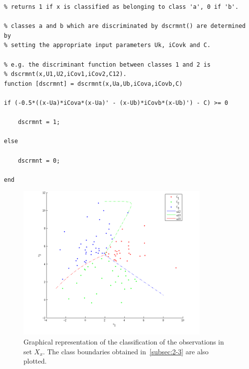 \documentclass[paper=a4, fontsize=11pt]{scrartcl} %
\numberwithin{equation}{section} %
\numberwithin{figure}{section} %
\numberwithin{table}{section} %
\begin{document}
\begin{lstlisting}[label=lst:2-4-classifier-code-dscrmnt,caption={MATLAB code for 2.4.}]
% template for the discriminant function between class a vs. class b.
% returns 1 if x is classified as belonging to class 'a', 0 if 'b'.

% classes a and b which are discriminated by dscrmnt() are determined by 
% setting the appropriate input parameters Uk, iCovk and C. 

% e.g. the discriminant function between classes 1 and 2 is 
% dscrmnt(x,U1,U2,iCov1,iCov2,C12).
function [dscrmnt] = dscrmnt(x,Ua,Ub,iCova,iCovb,C)

if (-0.5*((x-Ua)*iCova*(x-Ua)' - (x-Ub)*iCovb*(x-Ub)') - C) >= 0
    
    dscrmnt = 1;

else
    
    dscrmnt = 0;

end
\end{lstlisting}

\begin{figure}[H]

    \centering
    \includegraphics[width=0.85\textwidth]{figures/2-4.png}
    \caption{Graphical representation of the classification of the observations 
            in set $X_x$. The class boundaries obtained in~\ref{subsec:2-3} are 
            also plotted.}
    \label{fig:2-4-classifier}

\end{figure}

\subsection{}
\end{document}
